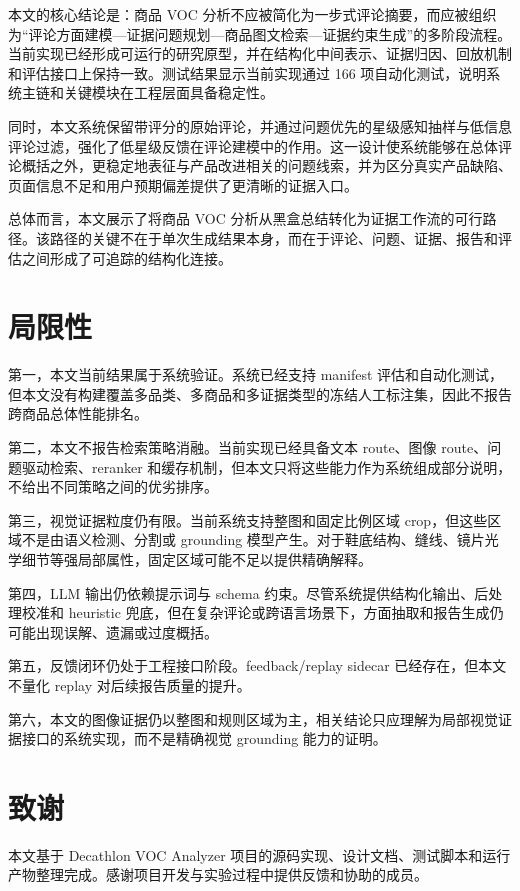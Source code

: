 \documentclass[11pt]{article}
\begin{document}
本文的核心结论是：商品 VOC 分析不应被简化为一步式评论摘要，而应被组织为``评论方面建模---证据问题规划---商品图文检索---证据约束生成''的多阶段流程。当前实现已经形成可运行的研究原型，并在结构化中间表示、证据归因、回放机制和评估接口上保持一致。测试结果显示当前实现通过 166 项自动化测试，说明系统主链和关键模块在工程层面具备稳定性。

同时，本文系统保留带评分的原始评论，并通过问题优先的星级感知抽样与低信息评论过滤，强化了低星级反馈在评论建模中的作用。这一设计使系统能够在总体评论概括之外，更稳定地表征与产品改进相关的问题线索，并为区分真实产品缺陷、页面信息不足和用户预期偏差提供了更清晰的证据入口。

总体而言，本文展示了将商品 VOC 分析从黑盒总结转化为证据工作流的可行路径。该路径的关键不在于单次生成结果本身，而在于评论、问题、证据、报告和评估之间形成了可追踪的结构化连接。

\section{局限性}
第一，本文当前结果属于系统验证。系统已经支持 manifest 评估和自动化测试，但本文没有构建覆盖多品类、多商品和多证据类型的冻结人工标注集，因此不报告跨商品总体性能排名。

第二，本文不报告检索策略消融。当前实现已经具备文本 route、图像 route、问题驱动检索、reranker 和缓存机制，但本文只将这些能力作为系统组成部分说明，不给出不同策略之间的优劣排序。

第三，视觉证据粒度仍有限。当前系统支持整图和固定比例区域 crop，但这些区域不是由语义检测、分割或 grounding 模型产生。对于鞋底结构、缝线、镜片光学细节等强局部属性，固定区域可能不足以提供精确解释。

第四，LLM 输出仍依赖提示词与 schema 约束。尽管系统提供结构化输出、后处理校准和 heuristic 兜底，但在复杂评论或跨语言场景下，方面抽取和报告生成仍可能出现误解、遗漏或过度概括。

第五，反馈闭环仍处于工程接口阶段。feedback/replay sidecar 已经存在，但本文不量化 replay 对后续报告质量的提升。

第六，本文的图像证据仍以整图和规则区域为主，相关结论只应理解为局部视觉证据接口的系统实现，而不是精确视觉 grounding 能力的证明。

\section{致谢}
本文基于 Decathlon VOC Analyzer 项目的源码实现、设计文档、测试脚本和运行产物整理完成。感谢项目开发与实验过程中提供反馈和协助的成员。



\end{document}
